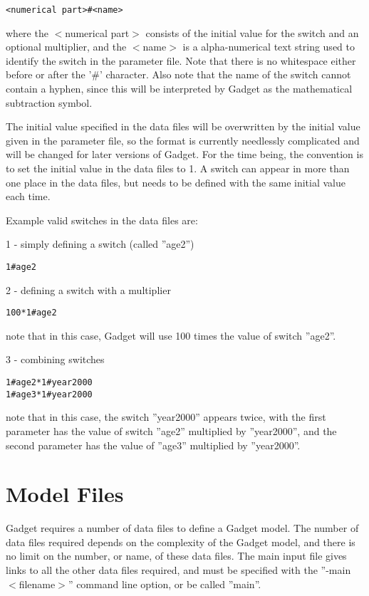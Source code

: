 \documentclass [a4paper, 10pt]{book}
\begin{document}
{\small\begin{verbatim}
<numerical part>#<name>
\end{verbatim}}

where the $<$numerical part$>$ consists of the initial value for the switch and an optional multiplier, and the $<$name$>$ is a alpha-numerical text string used to identify the switch in the parameter file.  Note that there is no whitespace either before or after the '\#' character.  Also note that the name of the switch cannot contain a hyphen, since this will be interpreted by Gadget as the mathematical subtraction symbol.

\bigskip
The initial value specified in the data files will be overwritten by the initial value given in the parameter file, so the format is currently needlessly complicated and will be changed for later versions of Gadget.  For the time being, the convention is to set the initial value in the data files to 1.  A switch can appear in more than one place in the data files, but needs to be defined with the same initial value each time.

\bigskip
Example valid switches in the data files are:\newline

1 - simply defining a switch (called ''age2'')
{\small\begin{verbatim}
1#age2
\end{verbatim}}

2 - defining a switch with a multiplier
{\small\begin{verbatim}
100*1#age2
\end{verbatim}}
note that in this case, Gadget will use 100 times the value of switch ''age2''.\newline

3 - combining switches
{\small\begin{verbatim}
1#age2*1#year2000
1#age3*1#year2000
\end{verbatim}}
note that in this case, the switch ''year2000'' appears twice, with the first parameter has the value of switch ''age2'' multiplied by ''year2000'', and the second parameter has the value of ''age3'' multiplied by ''year2000''.

\chapter{Model Files}\label{chap:model}
Gadget requires a number of data files to define a Gadget model.  The number of data files required depends on the complexity of the Gadget model, and there is no limit on the number, or name, of these data files.  The main input file gives links to all the other data files required, and must be specified with the ''-main $<$filename$>$'' command line option, or be called ''main''.
\end{document}

